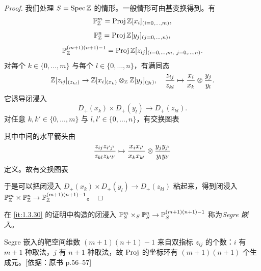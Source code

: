 \begin{proof}
我们处理 $S=\operatorname{Spec}\mathbb{Z}$ 的情形。一般情形可由基变换得到。有
\[
\mathbb{P}^m_{\mathbb{Z}}=\operatorname{Proj} \mathbb{Z}[x_i]_{(i=0,\dots,m)},
\]
\[
\mathbb{P}^n_{\mathbb{Z}}=\operatorname{Proj} \mathbb{Z}[y_j]_{(j=0,\dots,n)},
\]
\[
\mathbb{P}^{(m+1)(n+1)-1}_{\mathbb{Z}}=\operatorname{Proj} \mathbb{Z}[z_{ij}]_{(i=0,\dots,m,\ j=0,\dots,n)}.
\]
对每个 $k\in\{0,\dots,m\}$ 与每个 $l\in\{0,\dots,n\}$，有满同态
\[
\mathbb{Z}[z_{ij}]_{(z_{kl})}\to \mathbb{Z}[x_i]_{(x_k)}\otimes_{\mathbb{Z}}\mathbb{Z}[y_j]_{(y_l)},\quad
\frac{z_{ij}}{z_{kl}}\mapsto \frac{x_i}{x_k}\otimes\frac{y_j}{y_l}.
\]
它诱导闭浸入
\[
D_+(x_k)\times D_+(y_l)\to D_+(z_{kl}).
\]
对任意 $k,k'\in\{0,\dots,m\}$ 与 $l,l'\in\{0,\dots,n\}$，有交换图表
\begin{center}
\end{center}
其中中间的水平箭头由
\[
\frac{z_{ij}z_{i'j'}}{z_{kl}z_{k'l'}}\mapsto \frac{x_ix_{i'}}{x_kx_{k'}}\otimes\frac{y_jy_{j'}}{y_ly_{l'}}
\]
定义。故有交换图表
\begin{center}
\end{center}
于是可以把闭浸入 $D_+(x_k)\times D_+(y_l)\to D_+(z_{kl})$ 粘起来，得到闭浸入 $\mathbb{P}^m_{\mathbb{Z}}\times\mathbb{P}^n_{\mathbb{Z}}\to \mathbb{P}^{(m+1)(n+1)-1}_{\mathbb{Z}}$。
\end{proof}

在 \ref{it:1.3.30} 的证明中构造的闭浸入 $\mathbb{P}^m_S\times_S\mathbb{P}^n_S\to \mathbb{P}^{(m+1)(n+1)-1}_S$ 称为\emph{Segre 嵌入}。

\begin{tnote}
Segre 嵌入的靶空间维数 $(m+1)(n+1)-1$ 来自双指标 $z_{ij}$ 的个数：$i$ 有 $m+1$ 种取法，$j$ 有 $n+1$ 种取法，故 $\operatorname{Proj}$ 的坐标环有 $(m+1)(n+1)$ 个生成元。[依据：原书 p.56–57]
\end{tnote}

